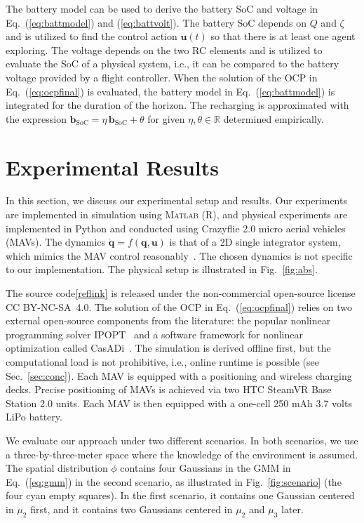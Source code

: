 \documentclass[letterpaper,10pt,conference,twoside]{IEEEtran}
\theoremstyle{definition}
\begin{document}
The battery model %
can be used to derive the battery SoC and voltage in Eq.~(\ref{eq:battmodel}) and (\ref{eq:battvolt}). The battery SoC depends on $Q$ and $\zeta$ and is utilized to find the control action $\mathbf{u}(t)$ so that there is at least one agent exploring. %
The voltage depends on the two RC elements and is utilized to evaluate the SoC of a physical system, i.e., it can be compared to the battery voltage provided by a flight controller. 
When the solution of the OCP in Eq.~(\ref{eq:ocpfinal}) is evaluated, the battery model in Eq.~(\ref{eq:battmodel}) is integrated for the duration of the horizon. The recharging is approximated with the expression $\mathbf{b}_{\text{SoC}}=\eta\,\mathbf{b}_{\text{SoC}}+\theta$ for given $\eta,\theta\in\mathbb{R}$ determined empirically.


\section{Experimental Results}\label{sec:res}
\noindent
In this section, we discuss our experimental setup and results. Our experiments are implemented in simulation using  \textsc{Matlab} (R), and physical experiments  are implemented in Python and conducted using Crazyflie 2.0 micro aerial vehicles (MAVs). 
The dynamics $\dot{\mathbf{q}}=f(\mathbf{q},\mathbf{u})$ is that of a 2D single integrator system, which mimics the MAV control reasonably~\cite{dong2023time}. The chosen dynamics is not specific to our implementation. The physical setup is illustrated in Fig.~\ref{fig:abs}.

The source code\cref{reflink} is released under the %
non-commercial open-source license CC BY-NC-SA~4.0. The solution of the OCP in Eq.~(\ref{eq:ocpfinal}) relies on two external open-source components from the literature: the popular nonlinear programming solver IPOPT~\cite{wachter2006implementation} and a software framework for nonlinear optimization called CasADi~\cite{andersson2012casadi}. The simulation is derived offline first, but the computational load is not prohibitive, i.e., online runtime is possible (see Sec.~\ref{sec:conc}). 
%
Each MAV is equipped with a positioning and wireless charging decks. Precise positioning of MAVs is achieved via two HTC SteamVR Base Station 2.0 units. Each MAV is then equipped with a one-cell 250 mAh 3.7 volts LiPo battery.%

We evaluate our approach under two different scenarios. In both scenarios, we use a three-by-three-meter space where the knowledge of the environment is assumed. The spatial distribution $\phi$ contains four Gaussians in the GMM in Eq.~(\ref{eq:gmm}) in the second scenario, as illustrated in Fig.~\ref{fig:scenario} (the four cyan empty squares). In the first scenario, it contains one Gaussian centered in $\mu_2$ first, and it contains two Gaussians centered in $\mu_2$ and $\mu_3$ later.
\end{document}
